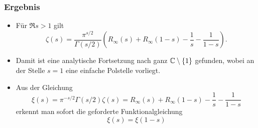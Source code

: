 \begin{frame}
    \frametitle{Ergebnis}
    \begin{itemize}
        \item Für $\Re s > 1$ gilt \[\zeta(s) = \frac{\pi^{s/2}}{\Gamma(s/2)} \left(R_\infty(s) + R_\infty(1-s) - \frac{1}{s} - \frac{1}{1-s}\right).\]
        \item Damit ist eine analytische Fortsetzung nach ganz $\mathbb{C}\setminus\{1\}$ gefunden, wobei an der Stelle $s = 1$ eine einfache Polstelle vorliegt.
        \item Aus der Gleichung \[\xi(s) = \pi^{-s/2} \Gamma(s/2)\zeta(s) = R_\infty(s) + R_\infty(1-s) - \frac{1}{s} - \frac{1}{1-s}\] erkennt man sofort die geforderte Funktionalgleichung \[\xi(s) = \xi(1-s)\]
    \end{itemize}
\end{frame}